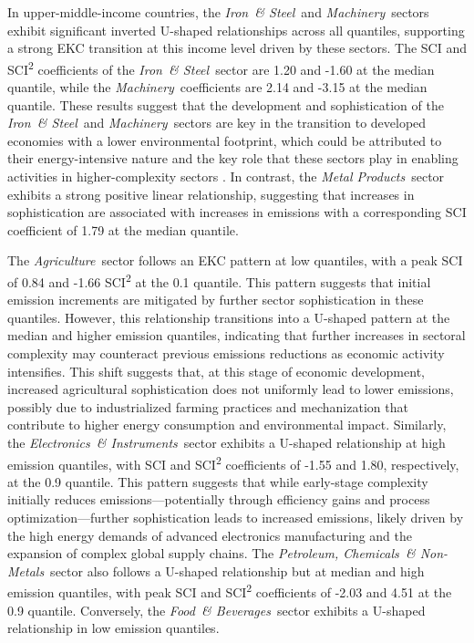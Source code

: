 \documentclass[10pt]{article}
\newcommand{\AG}{\textit{Agriculture}}
\newcommand{\EL}{\textit{Electronics~\& Instruments}}
\newcommand{\FO}{\textit{Food~\& Beverages}}
\newcommand{\IR}{\textit{Iron~\& Steel}}
\newcommand{\MA}{\textit{Machinery}}
\newcommand{\ME}{\textit{Metal Products}}
\newcommand{\PE}{\textit{Petroleum, Chemicals~\& Non-Metals}}
\begin{document}
In upper-middle-income countries, the \IR\ and \MA\ sectors exhibit significant inverted U-shaped relationships across all quantiles, supporting a strong EKC transition at this income level driven by these sectors. The SCI and SCI\textsuperscript{2} coefficients of the \IR\ sector are 1.20 and -1.60 at the median quantile, while the \MA\ coefficients are 2.14 and -3.15 at the median quantile. These results suggest that the development and sophistication of the \IR\ and \MA\ sectors are key in the transition to developed economies with a lower environmental footprint, which could be attributed to their energy-intensive nature and the key role that these sectors play in enabling activities in higher-complexity sectors \citep{LIU201864, gonzalez2011iron, Zhi-jun2011Machinery}. In contrast, the \ME\ sector exhibits a strong positive linear relationship, suggesting that increases in sophistication are associated with increases in emissions with a corresponding SCI coefficient of 1.79 at the median quantile. 

The \AG\ sector follows an EKC pattern at low quantiles, with a peak SCI of 0.84 and -1.66 SCI\textsuperscript{2} at the 0.1 quantile. This pattern suggests that initial emission increments are mitigated by further sector sophistication in these quantiles. However, this relationship transitions into a U-shaped pattern at the median and higher emission quantiles, indicating that further increases in sectoral complexity may counteract previous emissions reductions as economic activity intensifies. This shift suggests that, at this stage of economic development, increased agricultural sophistication does not uniformly lead to lower emissions, possibly due to industrialized farming practices and mechanization that contribute to higher energy consumption and environmental impact. Similarly, the \EL\ sector exhibits a U-shaped relationship at high emission quantiles, with SCI and SCI\textsuperscript{2} coefficients of -1.55 and 1.80, respectively, at the 0.9 quantile. This pattern suggests that while early-stage complexity initially reduces emissions—potentially through efficiency gains and process optimization—further sophistication leads to increased emissions, likely driven by the high energy demands of advanced electronics manufacturing and the expansion of complex global supply chains. The \PE\ sector also follows a U-shaped relationship but at median and high emission quantiles, with peak SCI and SCI\textsuperscript{2} coefficients of -2.03 and 4.51 at the 0.9 quantile. Conversely, the \FO\ sector exhibits a U-shaped relationship in low emission quantiles.
\end{document}
